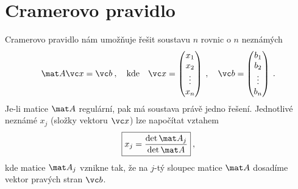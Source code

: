 \section*{Cramerovo pravidlo}

Cramerovo pravidlo nám umožňuje řešit soustavu $n$ rovnic o $n$ neznámých
\begin{align}
    \mat A \vc x = \vc b \:, 
    \quad \text{kde}\quad 
    \vc x = \begin{pmatrix}
        x_1 \\ x_2 \\ \vdots \\ x_n
    \end{pmatrix} \:,\quad
    \vc b = \begin{pmatrix}
        b_1 \\ b_2 \\ \vdots \\ b_n
    \end{pmatrix} \:.
\end{align}
Je-li matice $\mat A$ regulární, pak má soustava právě jedno řešení. Jednotlivé neznámé $x_j$ (složky vektoru $\vc x$) lze napočítat vztahem
\begin{align}
    \boxed{ x_j = \frac{\det \mat A_j}{\det \mat A} }\:,
\end{align}
kde matice $\mat A_j$ vznikne tak, že na $j$-tý sloupec matice $\mat A$ dosadíme vektor pravých stran $\vc b$.

